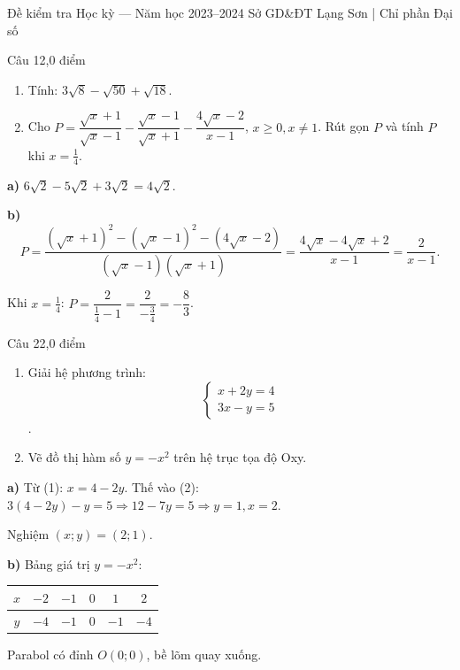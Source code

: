 ﻿%
%
  {Đề kiểm tra Học kỳ — Năm học 2023--2024}%
  {Sở GD\&ĐT Lạng Sơn | Chỉ phần Đại số}

\begin{de_cau}{Câu 1}{2,0 điểm}
\begin{enumerate}[label=\alph*)]
\item Tính: $3\sqrt{8}-\sqrt{50}+\sqrt{18}$.
\item Cho $P=\dfrac{\sqrt{x}+1}{\sqrt{x}-1}-\dfrac{\sqrt{x}-1}{\sqrt{x}+1}-\dfrac{4\sqrt{x}-2}{x-1}$, $x\geq 0, x\neq 1$.
Rút gọn $P$ và tính $P$ khi $x=\frac{1}{4}$.
\end{enumerate}
\end{de_cau}

\begin{loi_giai_cau}
\textbf{a)} $6\sqrt{2}-5\sqrt{2}+3\sqrt{2}=4\sqrt{2}$.

\textbf{b)}
\[P=\frac{(\sqrt{x}+1)^2-(\sqrt{x}-1)^2-(4\sqrt{x}-2)}{(\sqrt{x}-1)(\sqrt{x}+1)}
=\frac{4\sqrt{x}-4\sqrt{x}+2}{x-1}=\frac{2}{x-1}.\]

Khi $x=\frac{1}{4}$: $P=\dfrac{2}{\frac{1}{4}-1}=\dfrac{2}{-\frac{3}{4}}=-\dfrac{8}{3}$.
\end{loi_giai_cau}

\begin{de_cau}{Câu 2}{2,0 điểm}
\begin{enumerate}[label=\alph*)]
\item Giải hệ phương trình: 
\[ \begin{cases}x+2y=4\\3x-y=5\end{cases} \].
\item Vẽ đồ thị hàm số $y=-x^2$ trên hệ trục tọa độ Oxy.
\end{enumerate}
\end{de_cau}

\begin{loi_giai_cau}
\textbf{a)} Từ (1): $x=4-2y$. Thế vào (2): $3(4-2y)-y=5\Rightarrow 12-7y=5\Rightarrow y=1, x=2$.

Nghiệm $(x;y)=(2;1)$.

\textbf{b)} Bảng giá trị $y=-x^2$:
\begin{center}
\begin{tabular}{c|ccccc}$x$&$-2$&$-1$&$0$&$1$&$2$\\\hline$y$&$-4$&$-1$&$0$&$-1$&$-4$\end{tabular}
\end{center}
Parabol có đỉnh $O(0;0)$, bề lõm quay xuống.
\end{loi_giai_cau}

